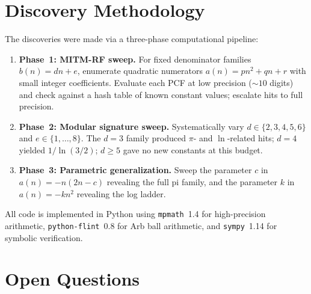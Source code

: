 \documentclass[11pt,a4paper]{article}
\theoremstyle{plain}
\theoremstyle{remark}
\begin{document}
\section{Discovery Methodology}

The discoveries were made via a three-phase computational pipeline:

\begin{enumerate}
\item \textbf{Phase~1: MITM-RF sweep.}
  For fixed denominator families $b(n) = dn + e$, enumerate quadratic
  numerators $a(n) = pn^2 + qn + r$ with small integer coefficients.
  Evaluate each PCF at low precision ($\sim\!10$ digits) and check
  against a hash table of known constant values; escalate hits to
  full precision.

\item \textbf{Phase~2: Modular signature sweep.}
  Systematically vary $d \in \{2,3,4,5,6\}$ and $e \in \{1,\ldots,8\}$.
  The $d=3$ family produced $\pi$- and $\ln$-related hits; $d=4$
  yielded $1/\ln(3/2)$; $d \ge 5$ gave no new constants at this budget.

\item \textbf{Phase~3: Parametric generalization.}
  Sweep the parameter $c$ in $a(n) = -n(2n-c)$ revealing the full pi
  family, and the parameter $k$ in $a(n) = -kn^2$ revealing the log ladder.
\end{enumerate}

All code is implemented in Python using \texttt{mpmath}~1.4 for
high-precision arithmetic, \texttt{python-flint}~0.8 for Arb ball
arithmetic, and \texttt{sympy}~1.14 for symbolic verification.

\section{Open Questions}
\end{document}
